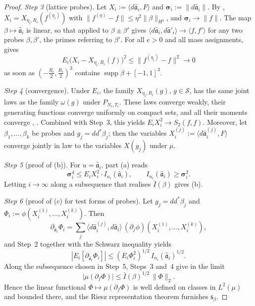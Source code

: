 \documentclass[11pt,letterpaper,reqno]{amsart}
\theoremstyle{definition}
\begin{document}
\begin{proof}
\emph{Step 3} (lattice probes).
Let $X_i:=\langle d\hat{\mathfrak a}_i,F\rangle$ and $\boldsymbol\sigma_i:=\|d\hat{\mathfrak a}_i\|$.
By \cite[Proposition~47.1\,(b2$'$), (b3), (b5)]{QEDIII}, $X_i=X_{\eta_i,R_i}(f^{(\eta_i)})$ with $\|f^{(\eta)}-f\|\le\eta^2\|\beta\|_{H^4}$, and $\boldsymbol\sigma_i\to\|f\|$.
The map $\beta\mapsto\hat{\mathfrak a}_i$ is linear, so that \cite[Proposition~47.1\,(b5)]{QEDIII} applied to $\beta\pm\beta'$ gives $\langle d\hat{\mathfrak a}_i,\allowbreak d\hat{\mathfrak a}'_i\rangle\to\langle f,\allowbreak f'\rangle$ for any two probes $\beta,\beta'$, the primes referring to $\beta'$.
For all $e>0$ and all mass assignments, \cite[Chapter~44, Lemma~2.1\,(a)--(c)]{QEDIII} gives
\begin{equation*}
E_i\bigl(X_i-X_{\eta_i,R_i}(f)\bigr)^2\le\|f^{(\eta_i)}-f\|^2\to0
\end{equation*}
as soon as $(-\frac{R_i}2,\frac{R_i}2)^3$ contains $\operatorname{supp}\beta+[-1,1]^3$.

\emph{Step 4} (convergence).
Under $E_i$, the family $X_{\eta_i,R_i}(g)$, $g\in\mathcal S$, has the same joint laws as the family $\omega(g)$ under $P_{N_i,T_i}$.
These laws converge weakly, their generating functions converge uniformly on compact sets, and all their moments converge \cite[Theorem~1.3\,(a)]{QEDII}, \cite[Chapter~44, Lemma~2.2]{QEDIII}.
Combined with Step~3, this yields $E_iX_i^2\to S_2(f,f)$.
Moreover, let $\beta_1,\dots,\beta_k$ be probes and $g_j=dd^*\beta_j$; then the variables $X_i^{(j)}:=\langle d\hat{\mathfrak a}_i^{(j)},F\rangle$ converge jointly in law to the variables $X(g_j)$ under $\mu$.

\emph{Step 5} (proof of (b)).
For $u=\hat{\mathfrak a}_i$, part (a) reads
\begin{equation*}
\boldsymbol\sigma_i^4\le E_iX_i^2\cdot I_{n_i}(\hat{\mathfrak a}_i),\qquad I_{n_i}(\hat{\mathfrak a}_i)\ge\boldsymbol\sigma_i^2.
\end{equation*}
Letting $i\to\infty$ along a subsequence that realises $\bar I(\beta)$ gives (b).

\emph{Step 6} (proof of (c) for test forms of probes).
Let $g_j=dd^*\beta_j$ and $\Phi_i:=\phi(X_i^{(1)},\dots,X_i^{(k)})$.
Then
\begin{equation*}
\partial_{\hat{\mathfrak a}_i}\Phi_i=\sum_j\langle d\hat{\mathfrak a}_i^{(j)},d\hat{\mathfrak a}_i\rangle\,(\partial_j\phi)(X_i^{(1)},\dots,X_i^{(k)}),
\end{equation*}
and Step~2 together with the Schwarz inequality yields
\begin{equation*}
|E_i[\partial_{\hat{\mathfrak a}_i}\Phi_i]|\le(E_i\Phi_i^2)^{1/2}\,I_{n_i}(\hat{\mathfrak a}_i)^{1/2}.
\end{equation*}
Along the subsequence chosen in Step~5, Steps~3 and~4 give in the limit
\begin{equation*}
|\mu(\partial_f\Phi)|\le\bar I(\beta)^{1/2}\,\|\Phi\|_2.
\end{equation*}
Hence the linear functional $\Phi\mapsto\mu(\partial_f\Phi)$ is well defined on classes in $L^2(\mu)$ and bounded there, and the Riesz representation theorem furnishes $\mathsf s_\beta$.


\end{proof}
\end{document}
